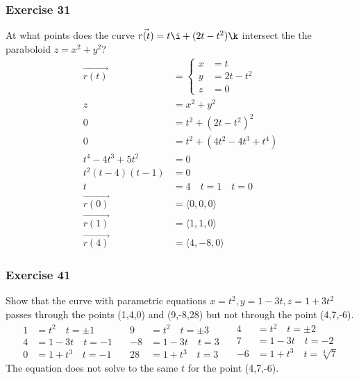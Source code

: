 \documentclass[letterpaper, 12pt]{math}
\begin{document}
\subsubsection*{Exercise 31}
At what points does the curve \( \vec{r(t)} = t\i+(2t-t^2)\k \) intersect the
the paraboloid \( z = x^2+y^2 \)?
\begin{align*}
  \overrightarrow{r(t)} &= \begin{cases}
    x &= t \\
    y &= 2t-t^2 \\
    z &= 0
  \end{cases} \\
  z &= x^2+y^2 \\
  0 &= t^2+(2t-t^2)^2 \\
  0 &= t^2+(4t^2-4t^3+t^4) \\
  t^4-4t^3+5t^2 &= 0 \\
  t^2(t-4)(t-1) &= 0 \\
  t &= 4 \quad t = 1 \quad t = 0 \\
  \overrightarrow{r(0)} &= \langle0,0,0\rangle \\
  \overrightarrow{r(1)} &= \langle1,1,0\rangle \\
  \overrightarrow{r(4)} &= \langle4,-8,0\rangle
\end{align*}

\subsubsection*{Exercise 41}
Show that the curve with parametric equations \( x = t^2, y = 1-3t, z = 1+3t^2
\) passes through the points (1,4,0) and (9,-8,28) but not through the point
(4,7,-6).
\[ \begin{split}
  1 &= t^2 \quad t = \pm1 \\
  4 &= 1-3t \quad t = -1 \\
  0 &= 1+t^3 \quad t = -1
\end{split}\quad\begin{split}
  9 &= t^2 \quad t = \pm3 \\
  -8 &= 1-3t \quad t = 3 \\
  28 &= 1+t^3 \quad t = 3
\end{split}\quad\begin{split}
  4 &= t^2 \quad t = \pm2 \\
  7 &= 1-3t \quad t = -2 \\
  -6 &= 1+t^3 \quad t = \sqrt[3]{7}
\end{split} \]
The equation does not solve to the same \( t \) for the point (4,7,-6).
\end{document}

